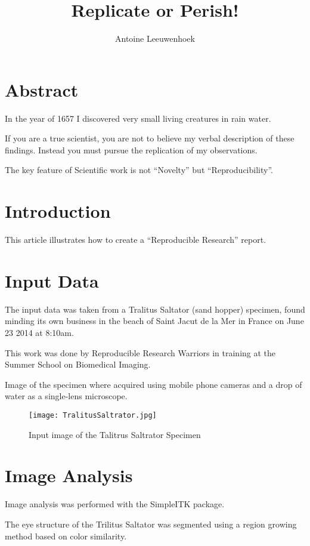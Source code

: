 \documentclass{article}
\title{Replicate or Perish!}
\author{Antoine Leeuwenhoek}
\begin{document}
\maketitle

\section{Abstract}

In the year of 1657 I discovered very small living creatures in rain water.

If you are a true scientist, you are not to believe my verbal description of these
findings. Instead you must pursue the replication of my observations.

The key feature of Scientific work is not ``Novelty'' but ``Reproducibility''.

\section{Introduction}

This article illustrates how to create a ``Reproducible Research'' report.

\section{Input Data}

The input data was taken from a Tralitus Saltator (sand hopper) specimen, found
minding its own business in the beach of Saint Jacut de la Mer in France on
June 23 2014 at 8:10am.

This work was done by Reproducible Research Warriors in training at the Summer
School on Biomedical Imaging.

Image of the specimen where acquired using mobile phone cameras and a drop of
water as a single-lens microscope.

\begin{figure}
\texttt{[image: TralitusSaltrator.jpg]}
\caption{Input image of the Talitrus Saltrator Specimen}
\end{figure}

\section{Image Analysis}

Image analysis was performed with the SimpleITK package.

The eye structure of the Trilitus Saltator was segmented using a region growing
method based on color similarity.
\end{document}
